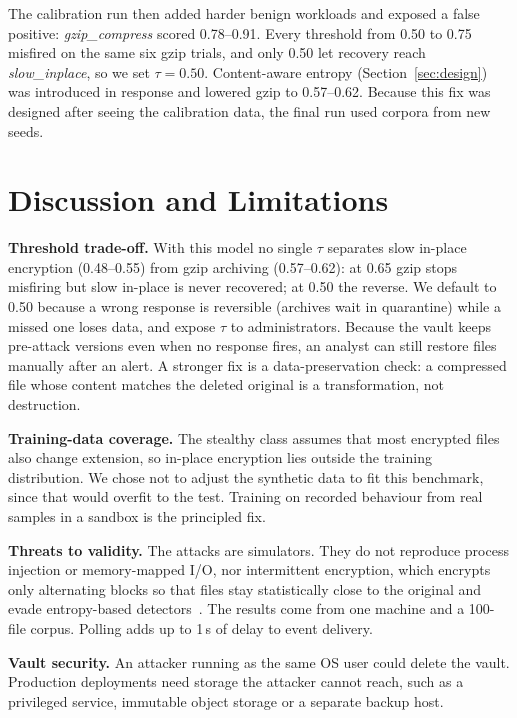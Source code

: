 \documentclass[conference]{IEEEtran}
\begin{document}
The calibration run then added harder benign workloads and exposed a false positive: \emph{gzip\_compress} scored 0.78--0.91. Every threshold from 0.50 to 0.75 misfired on the same six gzip trials, and only 0.50 let recovery reach \emph{slow\_inplace}, so we set $\tau = 0.50$. Content-aware entropy (Section~\ref{sec:design}) was introduced in response and lowered gzip to 0.57--0.62. Because this fix was designed after seeing the calibration data, the final run used corpora from new seeds.

\section{Discussion and Limitations}
\textbf{Threshold trade-off.} With this model no single $\tau$ separates slow in-place encryption (0.48--0.55) from gzip archiving (0.57--0.62): at 0.65 gzip stops misfiring but slow in-place is never recovered; at 0.50 the reverse. We default to 0.50 because a wrong response is reversible (archives wait in quarantine) while a missed one loses data, and expose $\tau$ to administrators. Because the vault keeps pre-attack versions even when no response fires, an analyst can still restore files manually after an alert. A stronger fix is a data-preservation check: a compressed file whose content matches the deleted original is a transformation, not destruction.

\textbf{Training-data coverage.} The stealthy class assumes that most encrypted files also change extension, so in-place encryption lies outside the training distribution. We chose not to adjust the synthetic data to fit this benchmark, since that would overfit to the test. Training on recorded behaviour from real samples in a sandbox is the principled fix.

\textbf{Threats to validity.} The attacks are simulators. They do not reproduce process injection or memory-mapped I/O, nor intermittent encryption, which encrypts only alternating blocks so that files stay statistically close to the original and evade entropy-based detectors~\cite{sophos2021lockfile}. The results come from one machine and a 100-file corpus. Polling adds up to 1\,s of delay to event delivery.

\textbf{Vault security.} An attacker running as the same OS user could delete the vault. Production deployments need storage the attacker cannot reach, such as a privileged service, immutable object storage or a separate backup host.
\end{document}
